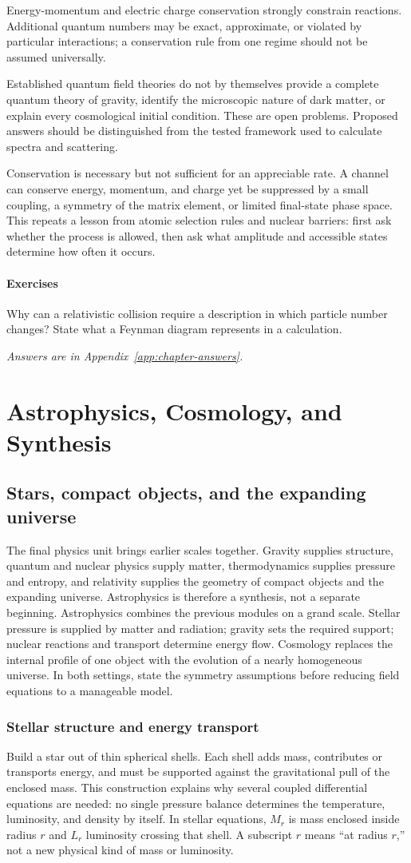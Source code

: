 \documentclass[11pt,oneside]{book}
\theoremstyle{reviewstyle}
\newcommand{\learningcheck}[1]{\subsection*{Exercises}\noindent #1\par\smallskip\noindent\emph{Answers are in Appendix~\ref{app:chapter-answers}.}}
\begin{document}
Energy-momentum and electric charge conservation strongly constrain reactions. Additional quantum numbers may be exact, approximate, or violated by particular interactions; a conservation rule from one regime should not be assumed universally.

Established quantum field theories do not by themselves provide a complete quantum theory of gravity, identify the microscopic nature of dark matter, or explain every cosmological initial condition. These are open problems. Proposed answers should be distinguished from the tested framework used to calculate spectra and scattering.

Conservation is necessary but not sufficient for an appreciable rate. A channel can conserve energy, momentum, and charge yet be suppressed by a small coupling, a symmetry of the matrix element, or limited final-state phase space. This repeats a lesson from atomic selection rules and nuclear barriers: first ask whether the process is allowed, then ask what amplitude and accessible states determine how often it occurs.

\learningcheck{Why can a relativistic collision require a description in which particle number changes? State what a Feynman diagram represents in a calculation.}

\part{Astrophysics, Cosmology, and Synthesis}
\chapter{Stars, compact objects, and the expanding universe}
The final physics unit brings earlier scales together. Gravity supplies structure, quantum and nuclear physics supply matter, thermodynamics supplies pressure and entropy, and relativity supplies the geometry of compact objects and the expanding universe. Astrophysics is therefore a synthesis, not a separate beginning.
Astrophysics combines the previous modules on a grand scale. Stellar pressure is supplied by matter and radiation; gravity sets the required support; nuclear reactions and transport determine energy flow. Cosmology replaces the internal profile of one object with the evolution of a nearly homogeneous universe. In both settings, state the symmetry assumptions before reducing field equations to a manageable model.

\section{Stellar structure and energy transport}
Build a star out of thin spherical shells. Each shell adds mass, contributes or transports energy, and must be supported against the gravitational pull of the enclosed mass. This construction explains why several coupled differential equations are needed: no single pressure balance determines the temperature, luminosity, and density by itself. In stellar equations, $M_r$ is mass enclosed inside radius $r$ and $L_r$ luminosity crossing that shell. A subscript $r$ means ``at radius $r$,'' not a new physical kind of mass or luminosity.
\end{document}
